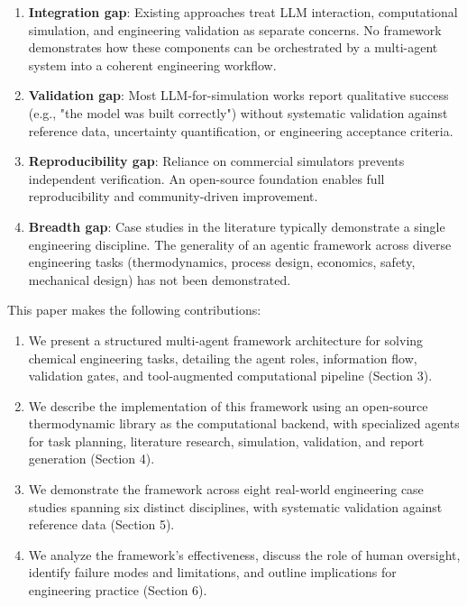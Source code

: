 \documentclass[review,3p]{elsarticle}
\begin{document}
\begin{enumerate}
  \item \textbf{Integration gap}: Existing approaches treat LLM interaction, computational simulation, and engineering validation as separate concerns. No framework demonstrates how these components can be orchestrated by a multi-agent system into a coherent engineering workflow.

  \item \textbf{Validation gap}: Most LLM-for-simulation works report qualitative success (e.g., "the model was built correctly") without systematic validation against reference data, uncertainty quantification, or engineering acceptance criteria.

  \item \textbf{Reproducibility gap}: Reliance on commercial simulators prevents independent verification. An open-source foundation enables full reproducibility and community-driven improvement.

  \item \textbf{Breadth gap}: Case studies in the literature typically demonstrate a single engineering discipline. The generality of an agentic framework across diverse engineering tasks (thermodynamics, process design, economics, safety, mechanical design) has not been demonstrated.
\end{enumerate}

This paper makes the following contributions:

\begin{enumerate}
  \item We present a structured multi-agent framework architecture for solving chemical engineering tasks, detailing the agent roles, information flow, validation gates, and tool-augmented computational pipeline (Section 3).

  \item We describe the implementation of this framework using an open-source thermodynamic library as the computational backend, with specialized agents for task planning, literature research, simulation, validation, and report generation (Section 4).

  \item We demonstrate the framework across eight real-world engineering case studies spanning six distinct disciplines, with systematic validation against reference data (Section 5).

  \item We analyze the framework's effectiveness, discuss the role of human oversight, identify failure modes and limitations, and outline implications for engineering practice (Section 6).
\end{enumerate}
\end{document}
